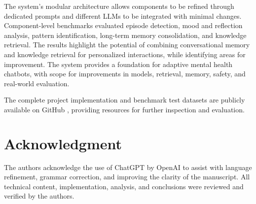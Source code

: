 \documentclass[conference]{IEEEtran}
\begin{document}
The system's modular architecture allows components to be refined through dedicated prompts and different LLMs to be integrated with minimal changes. Component-level benchmarks evaluated episode detection, mood and reflection analysis, pattern identification, long-term memory consolidation, and knowledge retrieval. The results highlight the potential of combining conversational memory and knowledge retrieval for personalized interactions, while identifying areas for improvement. The system provides a foundation for adaptive mental health chatbots, with scope for improvements in models, retrieval, memory, safety, and real-world evaluation.

The complete project implementation and benchmark test datasets are publicly available on GitHub \cite{mentalhealthchatbot}, providing resources for further inspection and evaluation.

\section*{Acknowledgment}
The authors acknowledge the use of ChatGPT by OpenAI \cite{chatgpt} to assist with language refinement, grammar correction, and improving the clarity of the manuscript. All technical content, implementation, analysis, and conclusions were reviewed and verified by the authors.
\end{document}
